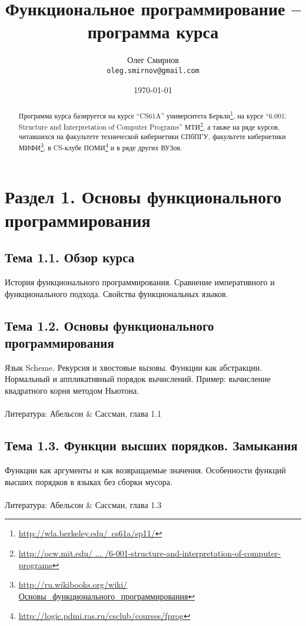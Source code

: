 \documentclass[a4paper,11pt]{article}
\author{Олег Смирнов \\
\texttt{oleg.smirnov@gmail.com}}
\date{\today}
\title{Функциональное программирование -- программа курса}
\begin{document}
\maketitle

\begin{abstract}
Программа курса базируется на курсе ``CS61A'' университета Беркли\footnote{
\href{http://goo.gl/kl7tc}{http://wla.berkeley.edu/~cs61a/sp11/}}, на курсе
``6.001: Structure and Interpretation of Computer Programs'' МТИ\footnote{
\href{http://goo.gl/MW2ME}
{http://ocw.mit.edu/ ... /6-001-structure-and-interpretation-of-computer-programs}},
а также на ряде курсов, читавшихся на факультете технической кибернетики СПбПГУ,
факультете кибернетики МИФИ\footnote{\href{http://goo.gl/pbV08}
{http://ru.wikibooks.org/wiki/Основы\_функционального\_программирования}},
в CS-клубе ПОМИ\footnote{
\href{http://goo.gl/N0la1}{http://logic.pdmi.ras.ru/csclub/courses/fprog}}
и в ряде других ВУЗов.
\end{abstract}

\section*{Раздел 1. Основы функционального программирования}

\subsection*{Тема 1.1. Обзор курса}
История функционального программирования. Сравнение императивного и
функционального подхода. Свойства функциональных языков.

\subsection*{Тема 1.2. Основы функционального программирования}
Язык Scheme. Рекурсия и хвостовые вызовы. Функции как абстракции. 
Нормальный и аппликативный порядок вычислений. Пример: вычисление 
квадратного корня методом Ньютона. 
\\\\
Литература: Абельсон \& Сассман, глава 1.1

\subsection*{Тема 1.3. Функции высших порядков. Замыкания}
Функции как аргументы и как возвращаемые значения. Особенности функций
высших порядков в языках без сборки мусора.
\\\\
Литература: Абельсон \& Сассман, глава 1.3
\end{document}
